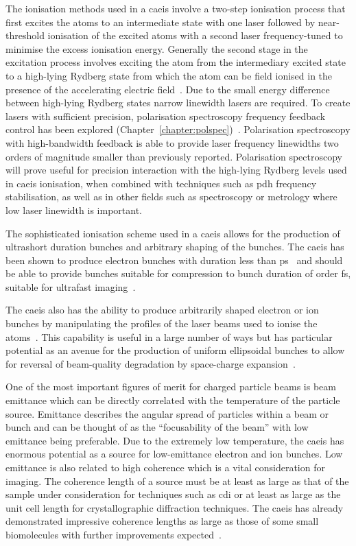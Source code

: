 The ionisation methods used in a \gls{caeis} involve a two-step ionisation process that first excites the atoms to an intermediate state with one laser followed by near-threshold ionisation of the excited atoms with a second laser frequency-tuned to minimise the excess ionisation energy.
Generally the second stage in the excitation process involves exciting the atom from the intermediary excited state to a high-lying Rydberg state from which the atom can be field ionised in the presence of the accelerating electric field~\cite{mcculloch_field_2017}.
Due to the small energy difference between high-lying Rydberg states narrow linewidth lasers are required.
To create lasers with sufficient precision, polarisation spectroscopy frequency feedback control has been explored (Chapter~\ref{chapter:polspec})~\cite{wieman_doppler-free_1976,torrance_sub-kilohertz_2016}.
Polarisation spectroscopy with high-bandwidth feedback is able to provide laser frequency linewidths two orders of magnitude smaller than previously reported.
Polarisation spectroscopy will prove useful for precision interaction with the high-lying Rydberg levels used in \gls{caeis} ionisation, when combined with techniques such as \gls{pdh} frequency stabilisation, as well as in other fields such as spectroscopy or metrology where low laser linewidth is important.

The sophisticated ionisation scheme used in a \gls{caeis} allows for the production of ultrashort duration bunches and arbitrary shaping of the bunches.
The \gls{caeis} has been shown to produce electron bunches with duration less than \unit[130]{ps}~\cite{speirs_identification_2017} and should be able to provide bunches suitable for compression to bunch duration of order \unit[100]{fs}, suitable for ultrafast imaging~\cite{van_oudheusden_compression_2010}.

The \gls{caeis} also has the ability to produce arbitrarily shaped electron or ion bunches by manipulating the profiles of the laser beams used to ionise the atoms~\cite{mcculloch_arbitrarily_2011}.
This capability is useful in a large number of ways but has particular potential as an avenue for the production of uniform ellipsoidal bunches to allow for reversal of beam-quality degradation by space-charge expansion~\cite{luiten_how_2004,thompson_bunch_2015}.

One of the most important figures of merit for charged particle beams is beam emittance which can be directly correlated with the temperature of the particle source.
Emittance describes the angular spread of particles within a beam or bunch and can be thought of as the ``focusability of the beam'' with low emittance being preferable.
Due to the extremely low temperature, the \gls{caeis} has enormous potential as a source for low-emittance electron and ion bunches.
Low emittance is also related to high coherence which is a vital consideration for imaging.
The coherence length of a source must be at least as large as that of the sample under consideration for techniques such as \gls{cdi} or at least as large as the unit cell length for crystallographic diffraction techniques.
The \gls{caeis} has already demonstrated impressive coherence lengths as large as those of some small biomolecules with further improvements expected~\cite{saliba_spatial_2012}.

